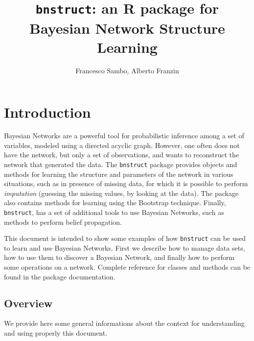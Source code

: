 \documentclass{article}\usepackage[]{graphicx}\usepackage[]{color}
\newcommand{\Rpackage}[1]{{\texttt{#1}}}
\begin{document}
\title{\texttt{bnstruct}: an R package for Bayesian Network Structure Learning}
\author{Francesco Sambo, Alberto Franzin}
\maketitle



\section{Introduction}
Bayesian Networks are a powerful tool for probabilistic inference among a set
of variables, modeled using a directed acyclic graph. However, one often does not
have the network, but only a set of observations, and wants to reconstruct the
network that generated the data. The \Rpackage{bnstruct} package provides objects and methods for
learning the structure and parameters of the network in various situations, such as
in presence of missing data, for which it is possible to perform \textit{imputation}
(guessing the missing values, by looking at the data). The package also contains methods
for learning using the Bootstrap technique.
Finally, \Rpackage{bnstruct}, has a set of additional tools to use Bayesian Networks, such as methods to perform
belief propagation.

This document is intended to show some examples of how \Rpackage{bnstruct} can be used
to learn and use Bayesian Networks. First we describe how to manage data sets,
how to use them to discover a Bayesian Network, and finally how to perform some
operations on a network. Complete reference for classes and methods can be found in the package documentation.

\subsection{Overview}
We provide here some general informations about the context for understanding
and using properly this document.
\end{document}
